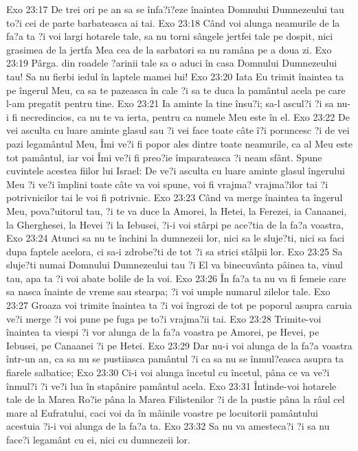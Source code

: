 Exo 23:17  De trei ori pe an sa se înfa?i?eze înaintea Domnului Dumnezeului tau to?i cei de parte barbateasca ai tai.
Exo 23:18  Când voi alunga neamurile de la fa?a ta ?i voi largi hotarele tale, sa nu torni sângele jertfei tale pe dospit, nici grasimea de la jertfa Mea cea de la sarbatori sa nu ramâna pe a doua zi.
Exo 23:19  Pârga. din roadele ?arinii tale sa o aduci în casa Domnului Dumnezeului tau! Sa nu fierbi iedul în laptele mamei lui!
Exo 23:20  Iata Eu trimit înaintea ta pe îngerul Meu, ca sa te pazeasca în cale ?i sa te duca la pamântul acela pe care l-am pregatit pentru tine.
Exo 23:21  Ia aminte la tine însu?i; sa-l ascul?i ?i sa nu-i fi necredincios, ca nu te va ierta, pentru ca numele Meu este în el.
Exo 23:22  De vei asculta cu luare aminte glasul sau ?i vei face toate câte î?i poruncesc ?i de vei pazi legamântul Meu, Îmi ve?i fi popor ales dintre toate neamurile, ca al Meu este tot pamântul, iar voi Îmi ve?i fi preo?ie împarateasca ?i neam sfânt. Spune cuvintele acestea fiilor lui Israel: De ve?i asculta cu luare aminte glasul îngerului Meu ?i ve?i împlini toate câte va voi spune, voi fi vrajma? vrajma?ilor tai ?i potrivnicilor tai le voi fi potrivnic.
Exo 23:23  Când va merge înaintea ta îngerul Meu, pova?uitorul tau, ?i te va duce la Amorei, la Hetei, la Ferezei, ia Canaanei, la Gherghesei, la Hevei ?i la Iebusei, ?i-i voi stârpi pe ace?tia de la fa?a voastra,
Exo 23:24  Atunci sa nu te închini la dumnezeii lor, nici sa le sluje?ti, nici sa faci dupa faptele acelora, ci sa-i zdrobe?ti de tot ?i sa strici stâlpii lor.
Exo 23:25  Sa sluje?ti numai Domnului Dumnezeului tau ?i El va binecuvânta pâinea ta, vinul tau, apa ta ?i voi abate bolile de la voi.
Exo 23:26  În fa?a ta nu va fi femeie care sa nasca înainte de vreme sau stearpa; ?i voi umple numarul zilelor tale.
Exo 23:27  Groaza voi trimite înaintea ta ?i voi îngrozi de tot pe poporul asupra caruia ve?i merge ?i voi pune pe fuga pe to?i vrajma?ii tai.
Exo 23:28  Trimite-voi înaintea ta viespi ?i vor alunga de la fa?a voastra pe Amorei, pe Hevei, pe Iebusei, pe Canaanei ?i pe Hetei.
Exo 23:29  Dar nu-i voi alunga de la fa?a voastra într-un an, ca sa nu se pustiiasca pamântul ?i ca sa nu se înmul?easca asupra ta fiarele salbatice;
Exo 23:30  Ci-i voi alunga încetul cu încetul, pâna ce va ve?i înmul?i ?i ve?i lua în stapânire pamântul acela.
Exo 23:31  Întinde-voi hotarele tale de la Marea Ro?ie pâna la Marea Filistenilor ?i de la pustie pâna la râul cel mare al Eufratului, caci voi da în mâinile voastre pe locuitorii pamântului acestuia ?i-i voi alunga de la fa?a ta.
Exo 23:32  Sa nu va amesteca?i ?i sa nu face?i legamânt cu ei, nici cu dumnezeii lor.
